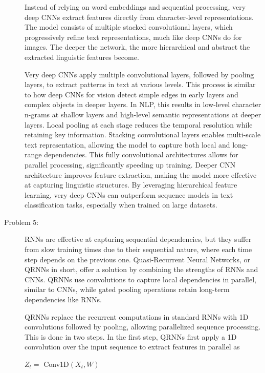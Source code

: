\documentclass[10pt]{article}
\begin{document}
\begin{description}
Instead of relying on word embeddings and sequential processing, very deep CNNs extract features directly from character-level representations. 
The model consists of multiple stacked convolutional layers, which progressively refine text representations, much like deep CNNs do for images. 
The deeper the network, the more hierarchical and abstract the extracted linguistic features become.

Very deep CNNs apply multiple convolutional layers, followed by pooling layers, to extract patterns in text at various levels. 
This process is similar to how deep CNNs for vision detect simple edges in early layers and complex objects in deeper layers. 
In NLP, this results in low-level character n-grams at shallow layers and high-level semantic representations at deeper layers.
Local pooling at each stage reduces the temporal resolution while retaining key information.
Stacking convolutional layers enables multi-scale text representation, allowing the model to capture both local and long-range dependencies.
This fully convolutional architectures allows for parallel processing, significantly speeding up training.
Deeper CNN architecture improves feature extraction, making the model more effective at capturing linguistic structures.
By leveraging hierarchical feature learning, very deep CNNs can outperform sequence models in text classification tasks, especially when trained on large datasets.

\pagebreak

\item[Problem 5:]  \hfill %

RNNs are effective at capturing sequential dependencies, but they suffer from slow training times due to their sequential nature, 
where each time step depends on the previous one. Quasi-Recurrent Neural Networks, or QRNNs in short, offer a solution by combining the strengths of RNNs and CNNs.
QRNNs use convolutions to capture local dependencies in parallel, similar to CNNs, while gated pooling operations retain long-term dependencies like RNNs.

QRNNs replace the recurrent computations in standard RNNs with 1D convolutions followed by pooling, allowing parallelized sequence processing. 
This is done in two steps. In the first step, QRNNs first apply a 1D convolution over the input sequence to extract features in parallel as

\begin{center}
    $Z_t = $ Conv1D$(X_t, W)$ 
\end{center}


\end{description}
\end{document}
